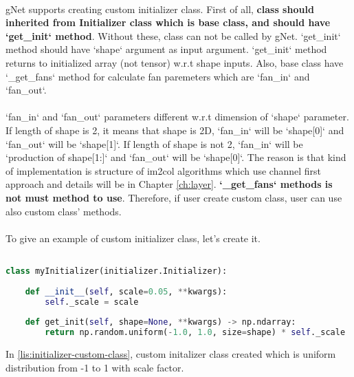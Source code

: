 \documentclass[12pt]{report}
\begin{document}
\paragraph{}
gNet supports creating custom initializer class. First of all, \textbf{class should inherited from Initializer class which is base class, and should have `get\_init` method}. Without these, class can not be called by gNet. `get\_init` method should have `shape` argument as input argument. `get\_init` method returns to initialized array (not tensor) w.r.t shape inputs. Also, base class have `\_get\_fans` method for calculate fan paremeters which are `fan\_in` and `fan\_out`. 

\paragraph{}
`fan\_in` and `fan\_out` parameters different w.r.t dimension of `shape` parameter. If length of shape is 2, it means that shape is 2D, `fan\_in` will be `shape[0]` and `fan\_out` will be `shape[1]`. If length of shape is not 2, `fan\_in` will be `production of shape[1:]` and `fan\_out` will be `shape[0]`. The reason is that kind of implementation is structure of im2col algorithms which use channel first approach and details will be in Chapter \ref{ch:layer}. \textbf{`\_get\_fans` methods is not must method to use}. Therefore, if user create custom class, user can use also custom class' methods. 

\paragraph{}
To give an example of custom initializer class, let's create it. 


\begin{lstlisting}[language=Python, numbers=none, caption={Custom initializer class.}, label={lis:initializer-custom-class}]

class myInitializer(initializer.Initializer):
 
	def __init__(self, scale=0.05, **kwargs):
		self._scale = scale
		
	def get_init(self, shape=None, **kwargs) -> np.ndarray:   
		return np.random.uniform(-1.0, 1.0, size=shape) * self._scale

\end{lstlisting}

In \ref{lis:initializer-custom-class}, custom initalizer class created which is uniform distribution from -1 to 1 with scale factor. 
\end{document}
